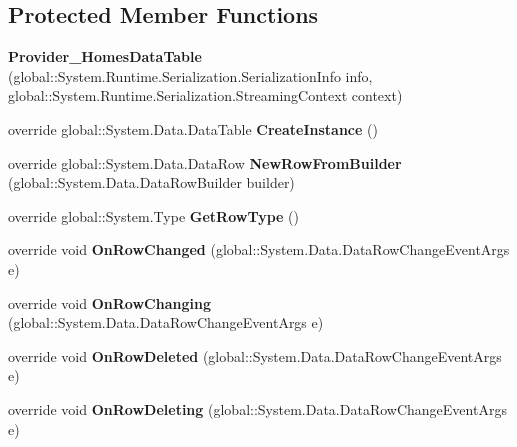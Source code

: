 \subsection*{Protected Member Functions}
\begin{DoxyCompactItemize}
\item 
\textbf{ Provider\+\_\+\+Homes\+Data\+Table} (global\+::\+System.\+Runtime.\+Serialization.\+Serialization\+Info info, global\+::\+System.\+Runtime.\+Serialization.\+Streaming\+Context context)
\item 
override global\+::\+System.\+Data.\+Data\+Table \textbf{ Create\+Instance} ()
\item 
override global\+::\+System.\+Data.\+Data\+Row \textbf{ New\+Row\+From\+Builder} (global\+::\+System.\+Data.\+Data\+Row\+Builder builder)
\item 
override global\+::\+System.\+Type \textbf{ Get\+Row\+Type} ()
\item 
override void \textbf{ On\+Row\+Changed} (global\+::\+System.\+Data.\+Data\+Row\+Change\+Event\+Args e)
\item 
override void \textbf{ On\+Row\+Changing} (global\+::\+System.\+Data.\+Data\+Row\+Change\+Event\+Args e)
\item 
override void \textbf{ On\+Row\+Deleted} (global\+::\+System.\+Data.\+Data\+Row\+Change\+Event\+Args e)
\item 
override void \textbf{ On\+Row\+Deleting} (global\+::\+System.\+Data.\+Data\+Row\+Change\+Event\+Args e)
\end{DoxyCompactItemize}
